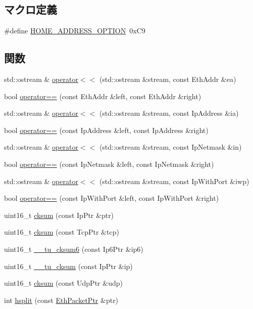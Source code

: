 \subsection*{マクロ定義}
\begin{DoxyCompactItemize}
\item 
\#define \hyperlink{inet_8hh_a7a2b87ebb21ea96cd4fcdf7e9511270b}{HOME\_\-ADDRESS\_\-OPTION}~0xC9
\end{DoxyCompactItemize}
\subsection*{関数}
\begin{DoxyCompactItemize}
\item 
std::ostream \& \hyperlink{namespaceNet_a33cc7c79cf286230e0e24e91f5e9538d}{operator$<$$<$} (std::ostream \&stream, const EthAddr \&ea)
\item 
bool \hyperlink{namespaceNet_a1f08134ae5bedef31ccc578238491634}{operator==} (const EthAddr \&left, const EthAddr \&right)
\item 
std::ostream \& \hyperlink{namespaceNet_a2949e3b1ccefd2ea4bf18bdbac77a27d}{operator$<$$<$} (std::ostream \&stream, const IpAddress \&ia)
\item 
bool \hyperlink{namespaceNet_a810805db3cea409a0911b6c62204e387}{operator==} (const IpAddress \&left, const IpAddress \&right)
\item 
std::ostream \& \hyperlink{namespaceNet_a74553ce1b89582d6984b297ff67e1e20}{operator$<$$<$} (std::ostream \&stream, const IpNetmask \&in)
\item 
bool \hyperlink{namespaceNet_a357f3a34efde4268307952994cc42425}{operator==} (const IpNetmask \&left, const IpNetmask \&right)
\item 
std::ostream \& \hyperlink{namespaceNet_a767c129a825fcade7c84662752bc7696}{operator$<$$<$} (std::ostream \&stream, const IpWithPort \&iwp)
\item 
bool \hyperlink{namespaceNet_a5ae44ae1ca684e220c0c9faaa1c5ad8e}{operator==} (const IpWithPort \&left, const IpWithPort \&right)
\item 
uint16\_\-t \hyperlink{namespaceNet_a7c7758a7af16c9b808dcb8ddf7aa1a34}{cksum} (const IpPtr \&ptr)
\item 
uint16\_\-t \hyperlink{namespaceNet_a6ccfd763e7871d9d574f28105e9d9741}{cksum} (const TcpPtr \&tcp)
\item 
uint16\_\-t \hyperlink{namespaceNet_ac143008a44a1456ad6b820780ca5980e}{\_\-\_\-tu\_\-cksum6} (const Ip6Ptr \&ip6)
\item 
uint16\_\-t \hyperlink{namespaceNet_aa160b2c868a18f1793e719a750f41891}{\_\-\_\-tu\_\-cksum} (const IpPtr \&ip)
\item 
uint16\_\-t \hyperlink{namespaceNet_a28dfbc35e8046118e0f49a89a57a717a}{cksum} (const UdpPtr \&udp)
\item 
int \hyperlink{namespaceNet_a7e50a230aeed27f50f5dd05a5768c74c}{hsplit} (const \hyperlink{classRefCountingPtr}{EthPacketPtr} \&ptr)
\end{DoxyCompactItemize}
